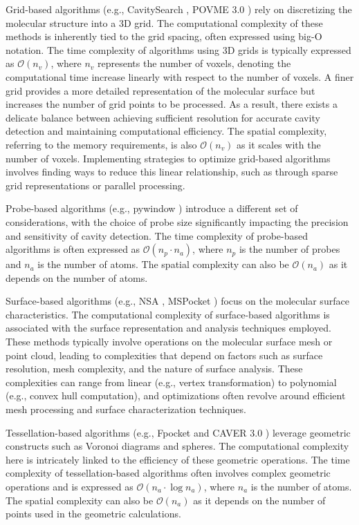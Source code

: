 \documentclass[Ingles]{phdthesis}
\def\eg{e.g.\onedot}
\begin{document}
Grid-based algorithms (\eg, CavitySearch \cite{cavitysearch}, POVME 3.0 \cite{povme}) rely on discretizing the molecular structure into a 3D grid. The computational complexity of these methods is inherently tied to the grid spacing, often expressed using big-O notation. The time complexity of algorithms using 3D grids is typically expressed as $\mathcal{O}(n_{v})$, where $n_{v}$ represents the number of voxels, denoting the computational time increase linearly with respect to the number of voxels. A finer grid provides a more detailed representation of the molecular surface but increases the number of grid points to be processed. As a result, there exists a delicate balance between achieving sufficient resolution for accurate cavity detection and maintaining computational efficiency. The spatial complexity, referring to the memory requirements, is also $\mathcal{O}(n_{v})$ as it scales with the number of voxels. Implementing strategies to optimize grid-based algorithms involves finding ways to reduce this linear relationship, such as through sparse grid representations or parallel processing.

Probe-based algorithms (\eg, pywindow \cite{pywindow}) introduce a different set of considerations, with the choice of probe size significantly impacting the precision and sensitivity of cavity detection. The time complexity of probe-based algorithms is often expressed as $\mathcal{O}(n_{p} \cdot n_{a})$, where $n_{p}$ is the number of probes and $n_{a}$ is the number of atoms. The spatial complexity can also be $\mathcal{O}(n_{a})$ as it depends on the number of atoms.

Surface-based algorithms (\eg, NSA \cite{nsa}, MSPocket \cite{mspocket}) focus on the molecular surface characteristics. The computational complexity of surface-based algorithms is associated with the surface representation and analysis techniques employed. These methods typically involve operations on the molecular surface mesh or point cloud, leading to complexities that depend on factors such as surface resolution, mesh complexity, and the nature of surface analysis. These complexities can range from linear (\eg, vertex transformation) to polynomial (\eg, convex hull computation), and optimizations often revolve around efficient mesh processing and surface characterization techniques.

Tessellation-based algorithms (\eg, Fpocket \cite{fpocket} and CAVER 3.0 \cite{caver3}) leverage geometric constructs such as Voronoi diagrams and \textalpha\space spheres. The computational complexity here is intricately linked to the efficiency of these geometric operations. The time complexity of tessellation-based algorithms often involves complex geometric operations and is expressed as $\mathcal{O}(n_{a} \cdot \log{n_{a}})$, where $n_{a}$ is the number of atoms. The spatial complexity can also be $\mathcal{O}(n_{a})$ as it depends on the number of points used in the geometric calculations.
\end{document}
